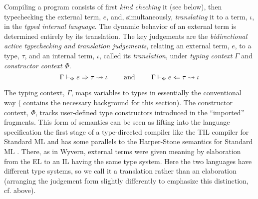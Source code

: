 Compiling a program consists of first \emph{kind checking} it (see below), then typechecking the external term, $e$, and,  simultaneously, \emph{translating} it to a term, $\iota$, in the \emph{typed internal language}. The dynamic behavior of an external term is determined entirely by its translation.
The key judgements are the \emph{bidirectional active typechecking and translation judgements}, relating an external term, $e$, to a {type}, $\tau$, and an internal term, $\iota$, called its \emph{translation}, under \emph{typing context} $\Gamma$ and \emph{constructor context} $\Phi$.
\[\Gamma \vdash_\Phi e \Rightarrow \tau \leadsto \iota
~~~~~~~\text{and}~~~~~~~
\Gamma \vdash_\Phi e \Leftarrow \tau \leadsto \iota\]

The typing context, $\Gamma$, maps variables to types in essentially the conventional way (\cite{pfpl} contains the necessary background for this section). The constructor context, $\Phi$, tracks user-defined type  constructors introduced in the ``imported'' fragments. %
 This form of semantics can be seen as lifting into the language specification the first stage of a type-directed compiler like the TIL compiler for Standard ML \cite{tarditi+:til-OLD} and has some parallels to the Harper-Stone semantics for Standard ML \cite{Harper00atype-theoretic}. There, as in Wyvern, external terms were given meaning by elaboration from the EL to an IL having the same type system. Here the two languages have different type systems, so we call it a translation rather than an elaboration (arranging the judgement form slightly differently to emphasize this distinction, cf. above).

